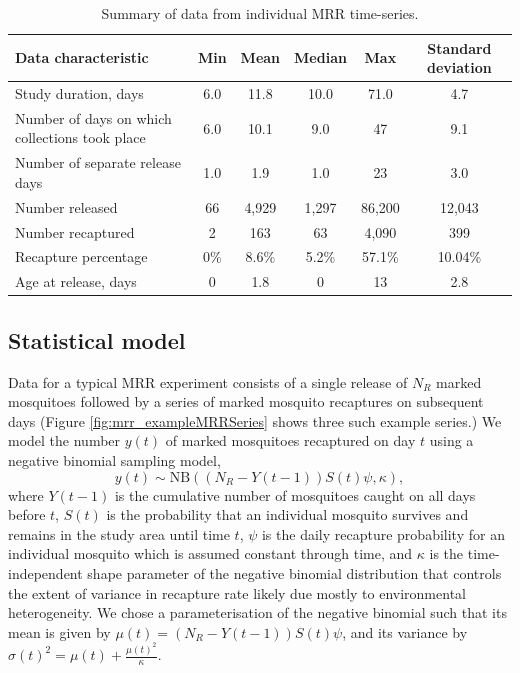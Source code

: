 \documentclass[12pt]{article}
\begin{document}
\begin{table}[htbp]
	\centering
	\footnotesize
	\begin{adjustwidth}{-0.5in}{-0.5in}%
		\begin{tabularx}{1.25\textwidth}{l|ccccc}
			\toprule
			\textbf{Data characteristic} & \textbf{Min} & \textbf{Mean} & \textbf{Median} & \textbf{Max} & \textbf{Standard deviation} \\
			\midrule
			Study duration, days & 6.0   & 11.8  & 10.0  & 71.0    & 4.7 \\
			Number of days on which collections took place & 6.0   & 10.1  & 9.0   & 47    & 9.1 \\
			Number of separate release days & 1.0     & 1.9   & 1.0     & 23    & 3.0 \\
			Number released & 66    & 4,929  & 1,297  & 86,200 & 12,043 \\
			Number recaptured & 2     & 163   & 63    & 4,090  & 399 \\
			Recapture percentage & 0\% & 8.6\% & 5.2\% & 57.1\% & 10.04\% \\
			Age at release, days & 0   & 1.8   & 0   & 13    & 2.8 \\
			\bottomrule
		\end{tabularx}%
		\caption{Summary of data from individual MRR time-series.}
		\label{tab:mrr_IndividualData}%
	\end{adjustwidth}
\end{table}%


\subsection{Statistical model}\label{sec:mrr_statistical}
Data for a typical MRR experiment consists of a single release of $N_{R}$ marked mosquitoes followed by a series of marked mosquito recaptures on subsequent days (Figure \ref{fig:mrr_exampleMRRSeries} shows three such example series.) We model the number $y(t)$ of marked mosquitoes recaptured on day $t$ using a negative binomial sampling model,
%
\begin{equation}\label{eq:NB}
y(t) \sim \text{NB}\left((N_{R} - Y(t-1)) S(t) \psi, \kappa\right),
\end{equation}
%
where $Y(t-1)$ is the cumulative number of mosquitoes caught on all days before $t$, $S(t)$ is the probability that an individual mosquito survives and remains in the study area until time $t$, $\psi$ is the daily recapture probability for an individual mosquito which is assumed constant through time, and $\kappa$ is the time-independent shape parameter of the negative binomial distribution that controls the extent of variance in recapture rate likely due mostly to environmental heterogeneity. We chose a parameterisation of the negative binomial such that its mean is given by $\mu(t) = (N_{R} - Y(t-1)) S(t) \psi$, and its variance by $\sigma(t)^2 = \mu(t) + \frac{\mu(t)^2}{\kappa}$. 
\end{document}
